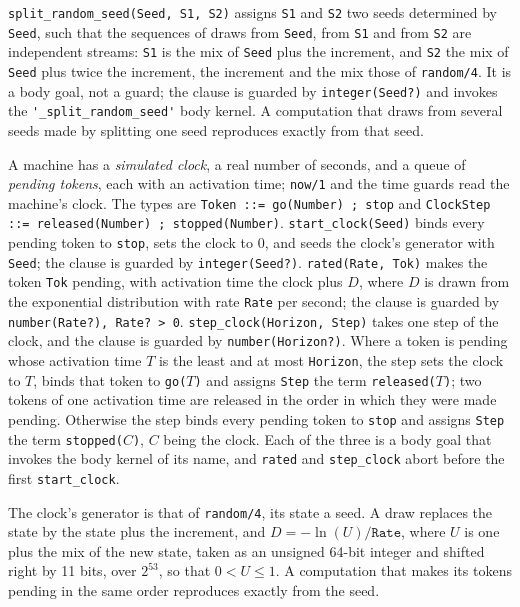 \verb|split_random_seed(Seed, S1, S2)| assigns \verb|S1| and \verb|S2| two seeds determined by \verb|Seed|, such that the sequences of draws from \verb|Seed|, from \verb|S1| and from \verb|S2| are independent streams: \verb|S1| is the mix of \verb|Seed| plus the increment, and \verb|S2| the mix of \verb|Seed| plus twice the increment, the increment and the mix those of \verb|random/4|. It is a body goal, not a guard; the clause is guarded by \verb|integer(Seed?)| and invokes the \verb|'_split_random_seed'| body kernel. A computation that draws from several seeds made by splitting one seed reproduces exactly from that seed.

A machine has a \emph{simulated clock}, a real number of seconds, and a queue of \emph{pending tokens}, each with an activation time; \verb|now/1| and the time guards read the machine's clock. The types are \verb|Token ::= go(Number) ; stop| and \verb|ClockStep ::= released(Number) ; stopped(Number)|. \verb|start_clock(Seed)| binds every pending token to \verb|stop|, sets the clock to 0, and seeds the clock's generator with \verb|Seed|; the clause is guarded by \verb|integer(Seed?)|. \verb|rated(Rate, Tok)| makes the token \verb|Tok| pending, with activation time the clock plus $D$, where $D$ is drawn from the exponential distribution with rate \verb|Rate| per second; the clause is guarded by \verb|number(Rate?), Rate? > 0|. \verb|step_clock(Horizon, Step)| takes one step of the clock, and the clause is guarded by \verb|number(Horizon?)|. Where a token is pending whose activation time $T$ is the least and at most \verb|Horizon|, the step sets the clock to $T$, binds that token to \verb|go(|$T$\verb|)| and assigns \verb|Step| the term \verb|released(|$T$\verb|)|; two tokens of one activation time are released in the order in which they were made pending. Otherwise the step binds every pending token to \verb|stop| and assigns \verb|Step| the term \verb|stopped(|$C$\verb|)|, $C$ being the clock. Each of the three is a body goal that invokes the body kernel of its name, and \verb|rated| and \verb|step_clock| abort before the first \verb|start_clock|.

The clock's generator is that of \verb|random/4|, its state a seed. A draw replaces the state by the state plus the increment, and $D = -\ln(U)/\mathtt{Rate}$, where $U$ is one plus the mix of the new state, taken as an unsigned 64-bit integer and shifted right by 11 bits, over $2^{53}$, so that $0 < U \le 1$. A computation that makes its tokens pending in the same order reproduces exactly from the seed.

